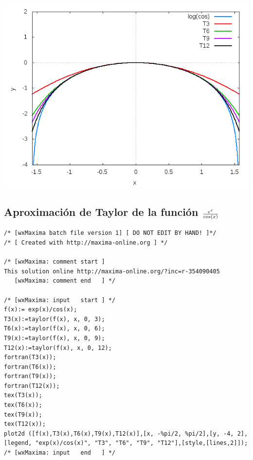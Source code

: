 \documentclass[12pt]{article}
\begin{document}
\begin{center}
\includegraphics[scale=.5]{logcos.png}
\end{center}
\pagebreak
\subsection{Aproximación de  Taylor de la función $ e^x \over cos(x)$}

\begin{verbatim}
/* [wxMaxima batch file version 1] [ DO NOT EDIT BY HAND! ]*/
/* [ Created with http://maxima-online.org ] */

/* [wxMaxima: comment start ]
This solution online http://maxima-online.org/?inc=r-354090405
   [wxMaxima: comment end   ] */

/* [wxMaxima: input   start ] */
f(x):= exp(x)/cos(x);
T3(x):=taylor(f(x), x, 0, 3);
T6(x):=taylor(f(x), x, 0, 6);
T9(x):=taylor(f(x), x, 0, 9);
T12(x):=taylor(f(x), x, 0, 12);
fortran(T3(x));
fortran(T6(x));
fortran(T9(x));
fortran(T12(x));
tex(T3(x));
tex(T6(x));
tex(T9(x));
tex(T12(x));
plot2d ([f(x),T3(x),T6(x),T9(x),T12(x)],[x, -%pi/2, %pi/2],[y, -4, 2],[legend, "exp(x)/cos(x)", "T3", "T6", "T9", "T12"],[style,[lines,2]]);
/* [wxMaxima: input   end   ] */

\end{verbatim}
\end{document}
